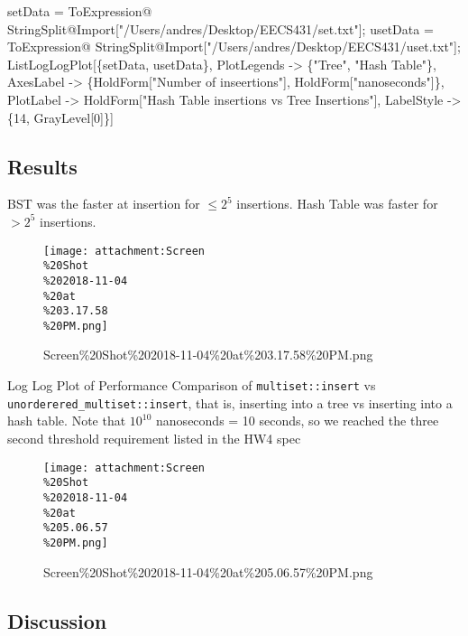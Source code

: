 \documentclass[11pt]{article}
\makeatletter
\def\maxwidth{\ifdim\Gin@nat@width>\linewidth\linewidth
    \else\Gin@nat@width\fi}
\let\Oldincludegraphics\includegraphics
\renewcommand{\includegraphics}[1]{\Oldincludegraphics[width=.8\maxwidth]{#1}}
\newenvironment{Shaded}{}{}
\newcommand{\DecValTok}[1]{\textcolor[rgb]{0.25,0.63,0.44}{{#1}}}
\newcommand{\FunctionTok}[1]{\textcolor[rgb]{0.02,0.16,0.49}{{#1}}}
\newcommand{\NormalTok}[1]{{#1}}
\def\gt{>}
\makeatother
\begin{document}
\begin{Shaded}
\begin{Highlighting}[]
\NormalTok{setData = }
\NormalTok{  ToExpression@}
\NormalTok{   StringSplit@Import["/Users/andres/Desktop/EECS431/}\FunctionTok{set}\NormalTok{.txt"];}
\NormalTok{usetData = }
\NormalTok{  ToExpression@}
\NormalTok{   StringSplit@Import["/Users/andres/Desktop/EECS431/uset.txt"];}
\FunctionTok{ListLogLogPlot}\NormalTok{[\{setData, usetData\}, }
\NormalTok{ PlotLegends -> \{"Tree", "Hash Table"\}, }
 \FunctionTok{AxesLabel}\NormalTok{ -> \{}\FunctionTok{HoldForm}\NormalTok{["Number of inseertions"], }
   \FunctionTok{HoldForm}\NormalTok{["nanoseconds"]\}, }
 \FunctionTok{PlotLabel}\NormalTok{ -> }\FunctionTok{HoldForm}\NormalTok{["Hash }\FunctionTok{Table}\NormalTok{ insertions vs Tree Insertions"], }
 \FunctionTok{LabelStyle}\NormalTok{ -> \{}\DecValTok{14}\NormalTok{, }\FunctionTok{GrayLevel}\NormalTok{[}\DecValTok{0}\NormalTok{]\}]}
\end{Highlighting}
\end{Shaded}

    \subsection{Results}\label{results}

BST was the faster at insertion for \(\leq 2^5\) insertions. Hash Table
was faster for \(\gt 2^5\) insertions.

    \begin{figure}
\centering
\texttt{[image: attachment:Screen\\\%20Shot\\\%202018-11-04\\\%20at\\\%203.17.58\\\%20PM.png]}
\caption{Screen\%20Shot\%202018-11-04\%20at\%203.17.58\%20PM.png}
\end{figure}

Log Log Plot of Performance Comparison of \texttt{multiset::insert} vs
\texttt{unorderered\_multiset::insert}, that is, inserting into a tree
vs inserting into a hash table. Note that \(10^{10}\) nanoseconds = 10
seconds, so we reached the three second threshold requirement listed in
the HW4 spec

    \begin{figure}
\centering
\texttt{[image: attachment:Screen\\\%20Shot\\\%202018-11-04\\\%20at\\\%205.06.57\\\%20PM.png]}
\caption{Screen\%20Shot\%202018-11-04\%20at\%205.06.57\%20PM.png}
\end{figure}

    \subsection{Discussion}\label{discussion}
\end{document}
